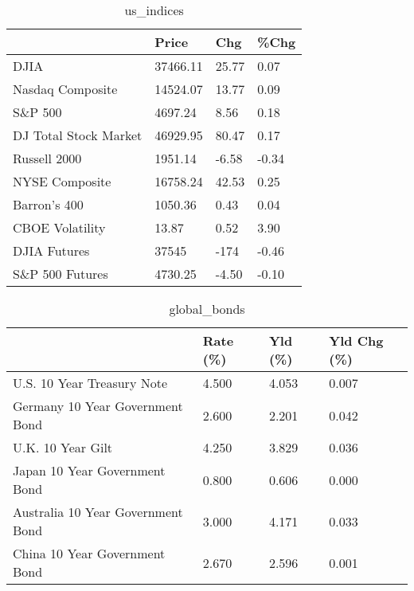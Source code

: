 \documentclass{article}%
\begin{document}
%


\begin{table}[htbp]%
\caption{us\_indices}%
\centering%
\begin{adjustbox}{width=1\textwidth}%
\begin{tabular}{llll}
\toprule
                      &    Price &   Chg &  \%Chg \\
\midrule
                 DJIA & 37466.11 & 25.77 &  0.07 \\
     Nasdaq Composite & 14524.07 & 13.77 &  0.09 \\
              S\&P 500 &  4697.24 &  8.56 &  0.18 \\
DJ Total Stock Market & 46929.95 & 80.47 &  0.17 \\
         Russell 2000 &  1951.14 & -6.58 & -0.34 \\
       NYSE Composite & 16758.24 & 42.53 &  0.25 \\
         Barron's 400 &  1050.36 &  0.43 &  0.04 \\
      CBOE Volatility &    13.87 &  0.52 &  3.90 \\
         DJIA Futures &    37545 &  -174 & -0.46 \\
      S\&P 500 Futures &  4730.25 & -4.50 & -0.10 \\
\bottomrule
\end{tabular}
%
\end{adjustbox}%
\end{table}

%


\begin{table}[htbp]%
\caption{global\_bonds}%
\centering%
\begin{adjustbox}{width=1\textwidth}%
\begin{tabular}{llll}
\toprule
                                  & Rate (\%) & Yld (\%) & Yld Chg (\%) \\
\midrule
       U.S. 10 Year Treasury Note &    4.500 &   4.053 &       0.007 \\
  Germany 10 Year Government Bond &    2.600 &   2.201 &       0.042 \\
                U.K. 10 Year Gilt &    4.250 &   3.829 &       0.036 \\
    Japan 10 Year Government Bond &    0.800 &   0.606 &       0.000 \\
Australia 10 Year Government Bond &    3.000 &   4.171 &       0.033 \\
    China 10 Year Government Bond &    2.670 &   2.596 &       0.001 \\
\bottomrule
\end{tabular}
%
\end{adjustbox}%
\end{table}
\end{document}
